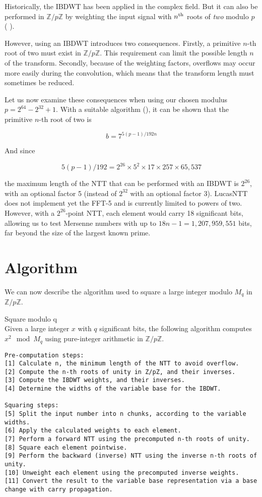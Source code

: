 \documentclass{article}
\begin{document}
Historically, the IBDWT has been applied in the complex field. But it can also be performed in $\mathbb{Z}/p\mathbb{Z}$ by weighting the input signal with $n\textsuperscript{th}$ roots of \emph{two} modulo $p$ (\cite{mon96} \cite{LucasNTT_multiplication}).

However, using an IBDWT introduces two consequences. Firstly, a primitive $n$-th root of two must exist in $\mathbb{Z}/p\mathbb{Z}$. This requirement can limit the possible length $n$ of the transform. Secondly, because of the weighting factors, overflows may occur more easily during the convolution, which means that the transform length must sometimes be reduced.

Let us now examine these consequences when using our chosen modulus $p = 2^{64} - 2^{32} + 1$. With a suitable algorithm (\cite{LucasNTT_nttanalysis}), it can be shown that the primitive $n$-th root of two is

$$
b = 7^{5(p-1) / 192n}
$$

\newpage
And since

$$
5(p-1) / 192 = 2^{26} \times 5^2 \times 17 \times 257 \times 65,537
$$

the maximum length of the NTT that can be performed with an IBDWT is $2^{26}$, with an optional factor 5 (instead of $2^{32}$ with an optional factor 3). LucasNTT does not implement yet the FFT-5 and is currently limited to powers of two. However, with a $2^{26}$-point NTT, each element would carry 18 significant bits, allowing us to test Mersenne numbers with up to $18n - 1 = 1,207,959,551$ bits, far beyond the size of the largest known prime.

\section{Algorithm}

We can now describe the algorithm used to square a large integer modulo $M_q$ in $\mathbb{Z}/p\mathbb{Z}$.

\begin{algorithm}{Square modulo q}\\
Given a large integer $x$ with $q$ significant bits, the following algorithm computes $x^2 \mod M_q$ using pure-integer arithmetic in $\mathbb{Z}/p\mathbb{Z}$.
\begin{verbatim}
Pre-computation steps:
[1] Calculate n, the minimum length of the NTT to avoid overflow.
[2] Compute the n-th roots of unity in Z/pZ, and their inverses.
[3] Compute the IBDWT weights, and their inverses.
[4] Determine the widths of the variable base for the IBDWT.

Squaring steps:
[5] Split the input number into n chunks, according to the variable widths.
[6] Apply the calculated weights to each element.
[7] Perform a forward NTT using the precomputed n-th roots of unity.
[8] Square each element pointwise.
[9] Perform the backward (inverse) NTT using the inverse n-th roots of unity.
[10] Unweight each element using the precomputed inverse weights.
[11] Convert the result to the variable base representation via a base change with carry propagation.
\end{verbatim}
\end{algorithm}
\end{document}
